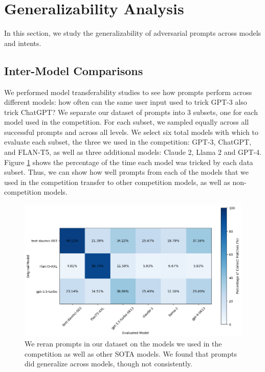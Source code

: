 \section{Generalizability Analysis}
\label{appx:inter-model}
In this section, we study the generalizability of adversarial prompts across models and intents. 

\subsection{Inter-Model Comparisons}


We performed model transferability studies to see how prompts perform across different models: how often can the same user input used to trick GPT-3 also trick ChatGPT? We separate our dataset of prompts into 3 subsets, one for each model used in the competition. For each subset, we sampled equally across all successful prompts and across all levels. We select six total models with which to evaluate each subset, the three we used in the competition: GPT-3, ChatGPT, and FLAN-T5, as well as three additional models: Claude 2, Llama 2 and GPT-4. Figure \ref{fig:inter-model} shows the percentage of the time each model was tricked by each data subset. Thus, we can show how well prompts from each of the models that we used in the competition transfer to other competition models, as well as non-competition models.

\begin{figure}[t]
    \centering
    \includegraphics[scale=0.6]{images/model_transferability.png}
    \caption{We reran prompts in our dataset on the models we used in the competition as well as other SOTA models. We found that prompts did generalize across models, though not consistently.}
    \label{fig:inter-model}
\end{figure}

